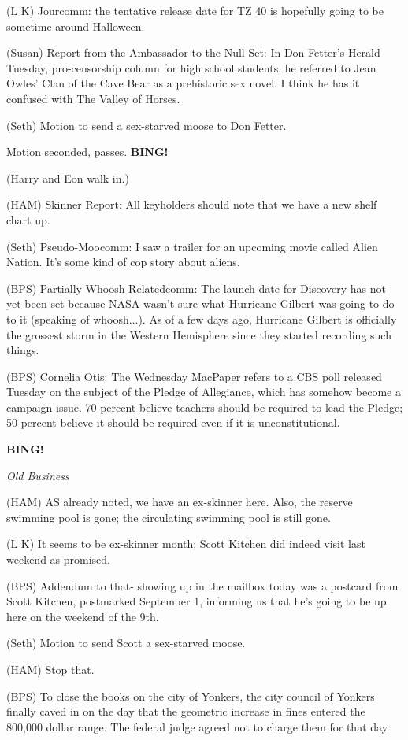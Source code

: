 \documentclass[12pt]{article}
\newcommand{\bing}{{\bf BING!} }
\newcommand{\goto}[1]{\bing \vskip 12pt \centerline{{\em{#1}}}}
\begin{document}
(L K) Jourcomm: the tentative release date for TZ 40 is hopefully going to be sometime around Halloween.

(Susan) Report from the Ambassador to the Null Set: In Don Fetter's Herald Tuesday, pro-censorship column for high school students, he referred to Jean Owles' Clan of the Cave Bear as a prehistoric sex novel. I think he has it confused with The Valley of Horses.

(Seth) Motion to send a sex-starved moose to Don Fetter.

Motion seconded, passes. \bing

(Harry and Eon walk in.)

(HAM) Skinner Report: All keyholders should note that we have a new shelf chart up.

(Seth) Pseudo-Moocomm: I saw a trailer for an upcoming movie called Alien Nation. It's some kind of cop story about aliens.

(BPS) Partially Whoosh-Relatedcomm: The launch date for Discovery has not yet been set because NASA wasn't sure what Hurricane Gilbert was going to do to it (speaking of whoosh...). As of a few days ago, Hurricane Gilbert is officially the grossest storm in the Western Hemisphere since they started recording such things.

(BPS) Cornelia Otis: The Wednesday MacPaper refers to a CBS poll released Tuesday on the subject of the Pledge of Allegiance, which has somehow become a campaign issue. 70 percent believe teachers should be required to lead the Pledge; 50 percent believe it should be required even if it is unconstitutional.

\goto{Old Business}

(HAM) AS already noted, we have an ex-skinner here. Also, the reserve swimming pool is gone; the circulating swimming pool is still gone.

(L K) It seems to be ex-skinner month; Scott Kitchen did indeed visit last weekend as promised.

(BPS) Addendum to that- showing up in the mailbox today was a postcard from Scott Kitchen, postmarked September 1, informing us that he's going to be up here on the weekend of the 9th.

(Seth) Motion to send Scott a sex-starved moose.

(HAM) Stop that.

(BPS) To close the books on the city of Yonkers, the city council of Yonkers finally caved in on the day that the geometric increase in fines entered the 800,000 dollar range. The federal judge agreed not to charge them for that day.
\end{document}
